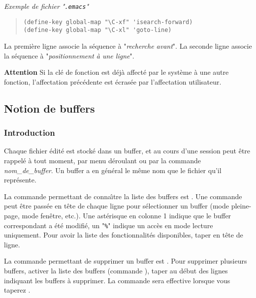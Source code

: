 \begin{example}
{\sl Exemple de fichier "{\tt .emacs}"}
\begin{quote}
\begin{verbatim}
(define-key global-map "\C-xf" 'isearch-forward)
(define-key global-map "\C-xl" 'goto-line)
\end{verbatim}
\end{quote}
La premi{\`e}re ligne associe la s{\'e}quence   {\`a} "{\it recherche avant}".
La seconde ligne associe la s{\'e}quence   {\`a} "{\it positionnement {\`a} une ligne}".
\end{example}

\begin{definition}{{\bf Attention}}
Si la cl{\'e} de fonction est d{\'e}j{\`a} affect{\'e} par le syst{\`e}me
{\`a} une autre fonction, l'affectation pr{\'e}c{\'e}dente
est {\'e}cras{\'e}e par l'affectation utilisateur.
\end{definition}

\subsection{\label{emacs-buffers}Notion de buffers}


\subsubsection{Introduction}

Chaque fichier {\'e}dit{\'e} est stock{\'e} dans un buffer,
et au cours d'une session peut {\^e}tre rappel{\'e} {\`a}
tout moment, par menu d{\'e}roulant ou par la commande 
 {\sl nom\_de\_buffer}. Un buffer a en g{\'e}n{\'e}ral le m{\^e}me
nom que le fichier qu'il repr{\'e}sente.

La commande permettant de conna{\^\i}tre la liste des buffers
est  . Une commande peut {\^e}tre pass{\'e}e
en t{\^e}te de chaque ligne pour s{\'e}lectionner un buffer
(mode pleine-page, mode fen{\^e}tre, etc.). Une ast{\'e}risque
en colonne 1 indique que le buffer correspondant a {\'e}t{\'e}
modifi{\'e}, un "\verb=%=" indique un acc{\`e}s en mode lecture uniquement.
Pour avoir la liste des fonctionnalit{\'e}s disponibles, taper
 en t{\^e}te de ligne.

La commande permettant de supprimer un buffer est  . Pour
supprimer plusieurs buffers, activer la liste des buffers (commande
 ), taper  au d{\'e}but des lignes indiquant les
buffers {\`a} supprimer. La commande sera effective lorsque
vous taperez .

